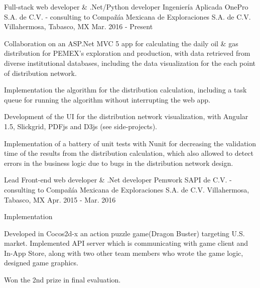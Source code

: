 


\begin{cventries}


\cventry
{Full-stack web developer \& .Net/Python developer} %
{Ingeniería Aplicada OnePro S.A. de C.V. - consulting to Compañía Mexicana de Exploraciones S.A. de C.V.} %
{Villahermosa, Tabasco, MX} %
{Mar. 2016 - Present} %
{ %
\begin{cvitems}
	\item{Collaboration on an ASP.Net MVC 5 app for calculating the daily oil \& gas distribution for PEMEX's exploration and production, with data retrieved from diverse institutional databases, including the data visualization for the each point of distribution network.}
	\item{Implementation the algorithm for the distribution calculation, including a task queue for running the algorithm without interrupting the web app.}
	\item{Development of the UI for the distribution network visualization, with Angular 1.5, Slickgrid, PDFjs and D3js {\tiny (see side-projects)}.}
	\item {Implementation of a battery of unit tests with Nunit for decreasing the validation time of the results from the distribution calculation, which also allowed to detect errors in the business logic due to bugs in the distribution network design.}
\end{cvitems}
}


\cventry
{Lead Front-end web developer \& .Net developer} %
{Pemwork SAPI de C.V. - consulting to Compañía Mexicana de Exploraciones S.A. de C.V.} %
{Villahermosa, Tabasco, MX} %
{Apr. 2015 - Mar. 2016} %
{ %
\begin{cvitems}
	\item{Implementation}
\item {Developed in Cocos2d-x an action puzzle game(Dragon Buster) targeting U.S. market. Implemented API server which is communicating with game client and In-App Store, along with two other team members who wrote the game logic, designed game graphics.}
\item {Won the 2nd prize in final evaluation.}
\end{cvitems}
}


\end{cventries}
